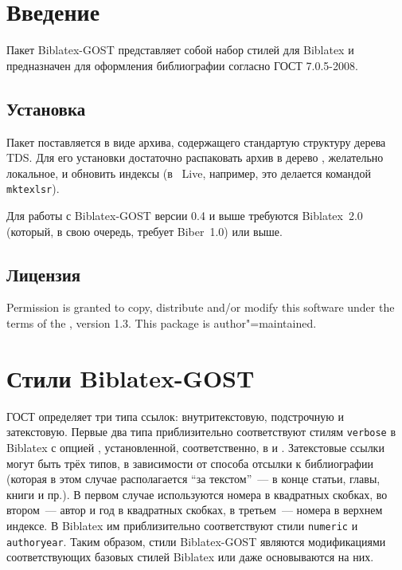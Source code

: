 \documentclass[11pt,a4paper,headings=small,numbers=enddot]{ltxdockit}[2011/03/25]
\newcommand*{\biber}{Biber\xspace}
\newcommand*{\biblatex}{Biblatex\xspace}
\newcommand*{\biblatexgost}{\biblatex-GOST\xspace}
\providecommand*{\printtitlepage}{}
\newcommand*{\bibsty}{\texttt}
\newcommand*{\gostname}{ГОСТ 7.0.5-2008}
\begin{document}
\printtitlepage
\tableofcontents
\listoftables

\section{Введение}
\label{sec:int}

Пакет \biblatexgost{} представляет 
собой набор стилей для \biblatex{} 
и предназначен для оформления библиографии согласно \gostname. 

\subsection{Установка}
\label{sec:install}

Пакет поставляется в виде архива, содержащего стандартую структуру дерева TDS. 
Для его установки достаточно распаковать архив в дерево \tex, желательно локальное, и 
обновить индексы (в \tex~Live, например, это делается командой \texttt{mktexlsr}).

Для работы с \biblatexgost версии 0.4 и выше требуются 
\biblatex~2.0 (который,
в свою очередь, требует \biber~1.0) или выше.

\subsection{Лицензия}
\label{sec:lic}

Permission is granted to copy, distribute and\slash or modify this software under the terms of the \lppl, version 1.3. This package is author"=maintained.


\section{Стили \biblatexgost}
\label{sec:styles}

ГОСТ определяет три типа ссылок: внутритекстовую, подстрочную и затекстовую.
Первые два типа приблизительно соответствуют стилям \bibsty{verbose} в \biblatex 
с опцией , установленной, соответственно, в  и 
. Затекстовые ссылки могут быть трёх типов, в зависимости 
от способа отсылки к библиографии (которая в этом случае располагается 
\enquote{за текстом}~--- в конце статьи, главы, книги и пр.). 
В первом случае используются номера в квадратных скобках, во 
втором~--- автор и год в квадратных скобках, в третьем~--- номера в верхнем индексе. 
В \biblatex им приблизительно 
соответствуют стили \bibsty{numeric} и \bibsty{authoryear}. Таким образом, 
стили \biblatexgost являются модификациями соответствующих базовых стилей 
\biblatex или даже основываются на них. 
\end{document}
